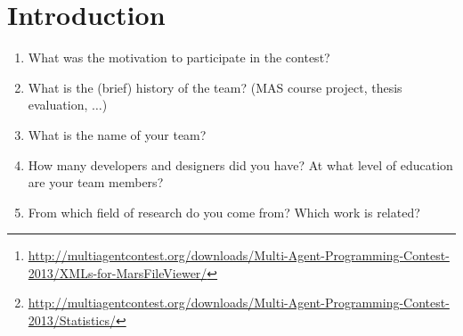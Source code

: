 \documentclass{llncs}
\begin{document}
\begin{abstract}
Please follow the given template structure for your submission. For each section, we are proposing some questions that the reader of the paper should be able to answer after reading it. (Please note that the technical report format is not like the ``form'' used in the registration template. A \emph{paper} style should be used.)\\ If you encounter any problems with some of the questions please do not hesitate to request clarification on the mailing list.

Additionally, if you mention the contest please do it in the following way:
\begin{itemize}
\item First time usage: "`Multi-Agent Programming Contest 2013 (MAPC)"' and a footnote with the url \url{http://multiagentcontest.org/2013}
\item Afterwards: "`MAPC"' or "`Contest"'.
\end{itemize}

Finally, we would like to ask you in section~\ref{sec:strategies} to select one match from the tournament that is exemplary for the strategy of your team and  use some screenshots of the monitor as well as the statistics that were generated during the run. Of course, you do not have to use all charts but just that onces that are useful to explain your strategy. The links:
\begin{itemize}
\item MarsFileMonitor\footnote{\url{http://multiagentcontest.org/downloads/Multi-Agent-Programming-Contest-2013/XMLs-for-MarsFileViewer/}}
\item Statistics:\footnote{\url{http://multiagentcontest.org/downloads/Multi-Agent-Programming-Contest-2013/Statistics/}}
\end{itemize}

Please provide also a link (on \url{http://multiagentcontest.org}) to the sources of your team.

If you have any questions regarding the layout please also have a look at the Technical Report from last year.
\newpage
\end{abstract}


\section{Introduction}

\begin{enumerate}
\item What was the motivation to participate in the contest?
\item What is the (brief) history of the team? (MAS course project,
  thesis evaluation, $\ldots$)
\item What is the name of your team?
\item How many developers and designers did you have? At what level of education are your team members?
\item From which field of research do you come from? Which work is related?
\end{enumerate}
\end{document}
